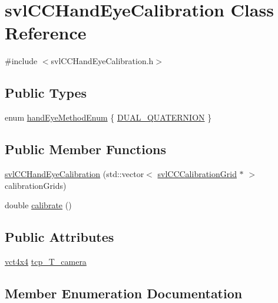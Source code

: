\hypertarget{classsvl_c_c_hand_eye_calibration}{}\section{svl\+C\+C\+Hand\+Eye\+Calibration Class Reference}
\label{classsvl_c_c_hand_eye_calibration}


{\ttfamily \#include $<$svl\+C\+C\+Hand\+Eye\+Calibration.\+h$>$}

\subsection*{Public Types}
\begin{DoxyCompactItemize}
\item 
enum \hyperlink{classsvl_c_c_hand_eye_calibration_a709466a8de18bc0010a220b0ffab4bbc}{hand\+Eye\+Method\+Enum} \{ \hyperlink{classsvl_c_c_hand_eye_calibration_a709466a8de18bc0010a220b0ffab4bbca6fc494defb9d979714fe0c2070971364}{D\+U\+A\+L\+\_\+\+Q\+U\+A\+T\+E\+R\+N\+I\+O\+N}
 \}
\end{DoxyCompactItemize}
\subsection*{Public Member Functions}
\begin{DoxyCompactItemize}
\item 
\hyperlink{classsvl_c_c_hand_eye_calibration_a84520fb144cce8d20e1f861521e6dc10}{svl\+C\+C\+Hand\+Eye\+Calibration} (std\+::vector$<$ \hyperlink{classsvl_c_c_calibration_grid}{svl\+C\+C\+Calibration\+Grid} $\ast$ $>$ calibration\+Grids)
\item 
double \hyperlink{classsvl_c_c_hand_eye_calibration_a3345f9c7cc91df6323b6393bbd6645f6}{calibrate} ()
\end{DoxyCompactItemize}
\subsection*{Public Attributes}
\begin{DoxyCompactItemize}
\item 
\hyperlink{vct_fixed_size_matrix_types_8h_abd214ec98373cc3197c87dfd916c673f}{vct4x4} \hyperlink{classsvl_c_c_hand_eye_calibration_a9dc79ab1c083e9f9baa017aa43545b1f}{tcp\+\_\+\+T\+\_\+camera}
\end{DoxyCompactItemize}


\subsection{Member Enumeration Documentation}
\hypertarget{classsvl_c_c_hand_eye_calibration_a709466a8de18bc0010a220b0ffab4bbc}{}
